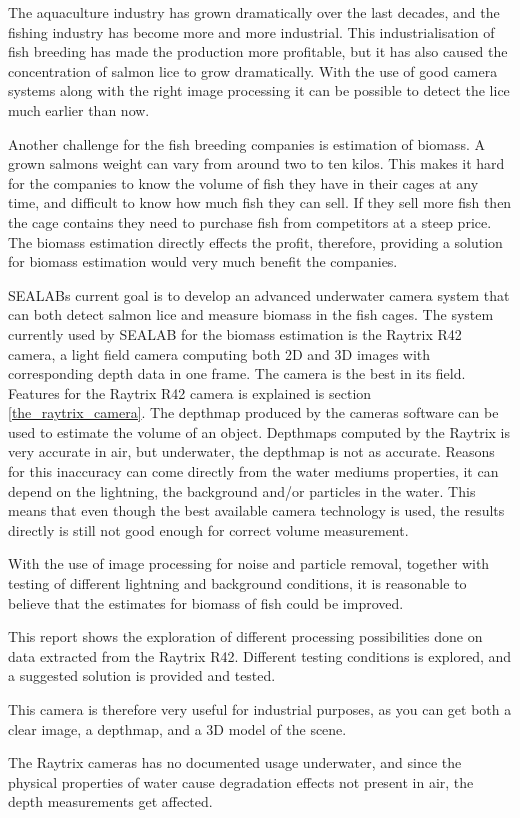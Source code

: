 The aquaculture industry has grown dramatically over the last decades, and the fishing industry has become more and more industrial. This industrialisation of fish breeding has made the production more profitable, but it has also caused the concentration of salmon lice to grow dramatically. With the use of good camera systems along with the right image processing it can be possible to detect the lice much earlier than now. 

Another challenge for the fish breeding companies is estimation of biomass. A grown salmons weight can vary from around two to ten kilos. This makes it hard for the companies to know the volume of fish they have in their cages at any time, and difficult to know how much fish they can sell. If they sell more fish then the cage contains they need to purchase fish from competitors at a steep price. The biomass estimation directly effects the profit, therefore, providing a solution for biomass estimation would very much benefit the companies. 

SEALABs current goal is to develop an advanced underwater camera system that can both detect salmon lice and measure biomass in the fish cages.
The system currently used by SEALAB for the biomass estimation is the Raytrix R42 camera, a light field camera computing both 2D and 3D images with corresponding depth data in one frame. The camera is the best in its field. Features for the Raytrix R42 camera is explained is section \ref{the_raytrix_camera}. 
The depthmap produced by the cameras software can be used to estimate the volume of an object. Depthmaps computed by the Raytrix is very accurate in air, but underwater, the depthmap is not as accurate. Reasons for this inaccuracy can come directly from the water mediums properties, it can depend on the lightning, the background and/or particles in the water. This means that even though the best available camera technology is used, the results directly is still not good enough for correct volume measurement.

With the use of image processing for noise and particle removal, together with testing of different lightning and background conditions, it is reasonable to believe that the estimates for biomass of fish could be improved.

This report shows the exploration of different processing possibilities done on data extracted from the Raytrix R42. Different testing conditions is explored, and a suggested solution is provided and tested.






This camera is therefore very useful for industrial purposes, as you can get both a clear image, a depthmap, and a 3D model of the scene.

 The Raytrix cameras has no documented usage underwater, and since the physical properties of water cause degradation effects not present in air, the depth measurements get affected.





